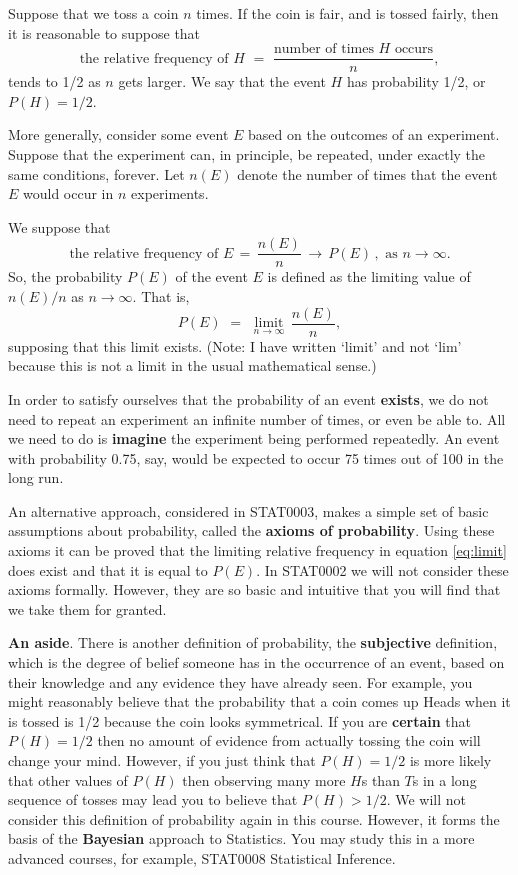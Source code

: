 \documentclass[
  11pt,
  british,
  openany, a4paper]{book}
\begin{document}
Suppose that we toss a coin \(n\) times. If the coin is fair, and is tossed fairly, then it is reasonable to suppose that
\[\mbox{the relative frequency of $H$} \,\,=\,\, 
\frac{\mbox{number of times $H$ occurs}}{n},\]
tends to 1/2 as \(n\) gets larger. We say that the event \(H\) has probability 1/2, or \(P(H)=1/2\).

More generally, consider some event \(E\) based on the outcomes of an experiment. Suppose that the experiment can, in principle, be repeated, under exactly the same conditions, forever. Let \(n(E)\) denote the number of times that the event \(E\) would occur in \(n\) experiments.

We suppose that
\[\mbox{the relative frequency of $E$} \,=\,
\frac{n(E)}{n} \,\longrightarrow\, P(E)\,, \,\, \mbox{as }n \longrightarrow \infty.\]
So, the probability \(P(E)\) of the event \(E\) is defined as the limiting value of \(n(E)/n\) as \(n \rightarrow \infty\). That is,
\begin{equation}
P(E) \,\,=\,\, \mathop {\mathrm{limit}}\limits_{n \rightarrow \infty}\,\frac{n(E)}{n},
\label{eq:limit}
\end{equation}
supposing that this limit exists. (Note: I have written `limit' and not `lim' because this is not a limit in the usual mathematical sense.)

In order to satisfy ourselves that the probability of an event \textbf{exists}, we do not need to repeat an experiment an infinite number of times, or even be able to. All we need to do is \textbf{imagine} the experiment being performed repeatedly. An event with probability 0.75, say, would be expected to occur 75 times out of 100 in the long run.

An alternative approach, considered in STAT0003, makes a simple set of basic assumptions about probability, called the \textbf{axioms of probability}. Using these axioms it can be proved that the limiting relative frequency in equation \eqref{eq:limit} does exist and that it is equal to \(P(E)\). In STAT0002 we will not consider these axioms formally. However, they are so basic and intuitive that you will find that we take them for granted.

\textbf{An aside}. There is another definition of probability, the \textbf{subjective} definition, which is the degree of belief someone has in the occurrence of an event, based on their knowledge and any evidence they have already seen. For example, you might reasonably believe that the probability that a coin comes up Heads when it is tossed is 1/2 because the coin looks symmetrical. If you are \textbf{certain} that \(P(H)=1/2\) then no amount of evidence from actually tossing the coin will change your mind. However, if you just think that \(P(H)=1/2\) is more likely that other values of \(P(H)\) then observing many more \(H\)s than \(T\)s in a long sequence of tosses may lead you to believe that \(P(H)>1/2\). We will not consider this definition of probability again in this course. However, it forms the basis of the \textbf{Bayesian} approach to Statistics. You may study this in a more advanced courses, for example, STAT0008 Statistical Inference.
\end{document}
